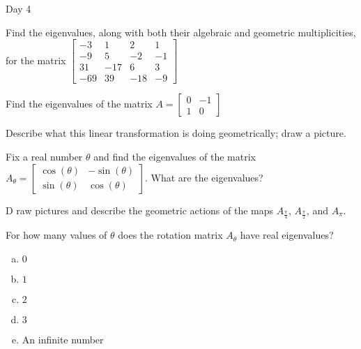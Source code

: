 \begin{applicationActivities}{Day 4}
\begin{activity}{0}
   Find the eigenvalues, along with both their algebraic and geometric multiplicities, for the matrix $\begin{bmatrix} -3 & 1 & 2 & 1 \\ -9 & 5 & -2 & -1 \\ 31 & -17 & 6 & 3 \\ -69 & 39 & -18 & -9 \end{bmatrix}$
\end{activity}

\begin{activity}{0}
  Find the eigenvalues of the matrix $A=\begin{bmatrix}0 & -1 \\ 1 & 0 \end{bmatrix}$
\end{activity}

\begin{activity}{0}
   Describe what this linear transformation is doing geometrically; draw a picture.
\end{activity}

\begin{activity}{0}
   Fix a real number $\theta$ and find the eigenvalues of the matrix $A_{\theta} = \begin{bmatrix} \cos(\theta) & -\sin(\theta) \\ \sin(\theta) & \cos (\theta) \end{bmatrix}$.  What are the eigenvalues?
\end{activity}

\begin{activity}{0} D
  raw pictures and describe the geometric actions of the maps $A_{\frac{\pi}{4
  }}$, $A_{\frac{\pi}{2}}$, and $A_{\pi}$.
\end{activity}

\begin{activity}{0}
  For how many values of $\theta$ does the rotation matrix $A_\theta$ have real eigenvalues?
\begin{enumerate}[(a)]
\item $0$
\item $1$
\item $2$
\item $3$
\item An infinite number
\end{enumerate}
\end{activity}

\end{applicationActivities}
